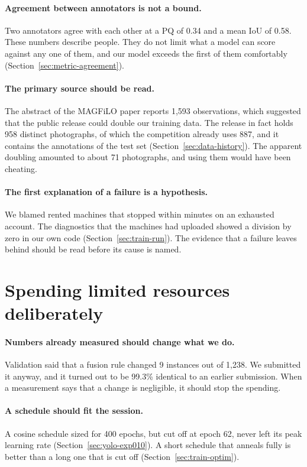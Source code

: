 \paragraph{Agreement between annotators is not a bound.} Two annotators agree with each other at a PQ of
0.34 and a mean IoU of 0.58. These numbers describe people. They do not limit what a model can score
against any one of them, and our model exceeds the first of them comfortably
(Section~\ref{sec:metric-agreement}).

\paragraph{The primary source should be read.} The abstract of the MAGFiLO paper reports 1,593
observations, which suggested that the public release could double our training data. The release in
fact holds 958 distinct photographs, of which the competition already uses 887, and it contains the
annotations of the test set (Section~\ref{sec:data-history}). The apparent doubling amounted to about 71
photographs, and using them would have been cheating.

\paragraph{The first explanation of a failure is a hypothesis.} We blamed rented machines that stopped
within minutes on an exhausted account. The diagnostics that the machines had uploaded showed a division
by zero in our own code (Section~\ref{sec:train-run}). The evidence that a failure leaves behind should
be read before its cause is named.

\section{Spending limited resources deliberately}\label{sec:lessons-spend}

\paragraph{Numbers already measured should change what we do.} Validation said that a fusion rule
changed 9 instances out of 1,238. We submitted it anyway, and it turned out to be 99.3\% identical to an
earlier submission. When a measurement says that a change is negligible, it should stop the spending.

\paragraph{A schedule should fit the session.} A cosine schedule sized for 400 epochs, but cut off at
epoch 62, never left its peak learning rate (Section~\ref{sec:yolo-exp010}). A short schedule that
anneals fully is better than a long one that is cut off (Section~\ref{sec:train-optim}).

